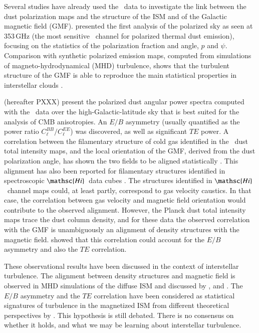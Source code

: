 \documentclass[longauth,traditabstract]{aa}
\newcommand{\hi}{\ensuremath{\mathsc {Hi}}}
\begin{document}
Several studies have already used the \Planck\ data to investigate the link between the dust polarization maps and the structure of the ISM and of the Galactic magnetic field (GMF). \citet{planck2014-XIX} presented the first analysis of the polarized sky as seen at 353\,GHz (the most sensitive \Planck\ channel for polarized thermal dust emission), focusing on the statistics of the polarization fraction and angle, $p$ and $\psi$. Comparison with synthetic polarized emission maps, computed from simulations of magneto-hydrodynamical (MHD) turbulence, shows that the turbulent structure of the GMF is able to reproduce the main statistical properties in interstellar clouds \citep{planck2014-XX}. 

\citet{planck2014-XXX} (hereafter PXXX) present the polarized dust angular power spectra computed with the \Planck\ data over the high-Galactic-latitude sky that is best 
suited for the analysis of CMB anisotropies.  An $E/B$ asymmetry (usually quantified as the power ratio $C_\ell^{BB}/C_\ell^{EE}$) was discovered,
as well as significant $TE$ power.
%
A correlation between the filamentary structure of cold gas identified in the \Planck\ dust total intensity maps, 
and the local orientation of the GMF, derived from the dust polarization angle, 
has shown the two fields to be aligned statistically 
\citep{planck2014-XXXII,planck2015-XXXV,Kalberla16}. 
This alignment has also been reported for filamentary structures identified in spectroscopic \hi\ data cubes \citep{McClure06,Clark13,Clark15}.
%
The structures identified in \hi\ channel maps could, at least partly, correspond to gas velocity caustics. In that case,
the correlation between gas velocity and magnetic field orientation \citep{Lazarian18} would contribute to the observed alignment. 
However, the Planck dust total intensity maps trace the dust column density, and for these data the observed correlation with the GMF is 
unambiguously an alignment of density structures with the magnetic field. 
\citet{planck2015-XXXVIII} showed 
that this correlation could account for the $E/B$ asymmetry and also
the $TE$ correlation. 


These observational results have been discussed in the context of interstellar  turbulence.
The alignment between density structures and magnetic field 
is observed in MHD simulations of the diffuse ISM and discussed by \citet{Hennebelle13}, \citet{Inoue16} and \citet{Soler17}.
The $E/B$ asymmetry and the $TE$ correlation have been considered as statistical signatures of turbulence in the magnetized ISM 
from different theoretical perspectives by \citet{Caldwell17,Kandel17,Kritsuk17,Kandel18}. This hypothesis is still debated.  There is no consensus
on whether it holds, and what we may be learning about interstellar turbulence. 
\end{document}
